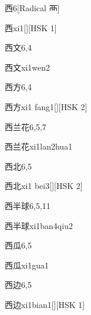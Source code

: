 \begin{entry}{西}{6}[Radical 襾]
  \begin{phonetics}{西}{xi1}[][HSK 1]
  \end{phonetics}
\end{entry}

\begin{entry}{西文}{6,4}
  \begin{phonetics}{西文}{xi1wen2}
  \end{phonetics}
\end{entry}

\begin{entry}{西方}{6,4}
  \begin{phonetics}{西方}{xi1 fang1}[][HSK 2]
  \end{phonetics}
\end{entry}

\begin{entry}{西兰花}{6,5,7}
  \begin{phonetics}{西兰花}{xi1lan2hua1}
  \end{phonetics}
\end{entry}

\begin{entry}{西北}{6,5}
  \begin{phonetics}{西北}{xi1 bei3}[][HSK 2]
  \end{phonetics}
\end{entry}

\begin{entry}{西半球}{6,5,11}
  \begin{phonetics}{西半球}{xi1ban4qiu2}
  \end{phonetics}
\end{entry}

\begin{entry}{西瓜}{6,5}
  \begin{phonetics}{西瓜}{xi1gua1}
  \end{phonetics}
\end{entry}

\begin{entry}{西边}{6,5}
  \begin{phonetics}{西边}{xi1bian1}[][HSK 1]
  \end{phonetics}
\end{entry}

